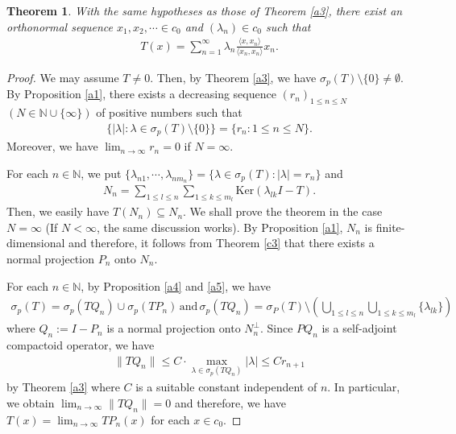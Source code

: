 \documentclass[12pt]{amsart}
\theoremstyle{plain}
\newtheorem{thm}[prop] {Theorem}
\theoremstyle{definition}
\begin{document}
\begin{thm} \label{a6}
  With the same hypotheses as those of Theorem \ref{a3}, there exist an orthonormal sequence $x_1, x_2, \cdots \in c_0$ and $(\lambda_n) \in c_0$ such that 
  \begin{align*}
    T(x) = \sum_{n=1}^\infty \lambda_n \frac{\langle x, x_n \rangle}{\langle x_n, x_n \rangle} x_n.
  \end{align*}
\end{thm}
\begin{proof}
  We may assume $T \neq 0$. Then, by Theorem \ref{a3}, we have $\sigma_p(T) \setminus \{0\} \neq \emptyset$. By Proposition \ref{a1}, there exists a decreasing sequence $(r_n)_{1 \le n \le N}$ $(N \in \mathbb{N} \cup \{\infty\})$ of positive numbers such that 
  \begin{align*}
    \{ |\lambda| : \lambda \in \sigma_p(T) \setminus \{0\}  \} = \{r_n : 1 \le n \le N\}.
  \end{align*}
Moreover, we have $\lim_{n \to \infty} r_n = 0$ if $N = \infty$. \par
 For each $n \in \mathbb{N}$, we put $\{ \lambda_{n 1}, \cdots , \lambda_{n m_n}\} = \{ \lambda \in \sigma_p(T) : |\lambda| = r_n\}$ and 
  \begin{align*}
     N_n = \sum_{1 \le l \le n} \sum_{1\le k \le m_l} \text{Ker} (\lambda_{lk} I - T).
  \end{align*}
  Then, we easily have $T(N_n) \subseteq N_n$. We shall prove the theorem in the case $N = \infty$ (If $N < \infty$, the same discussion works). By Proposition \ref{a1}, $N_n$ is finite-dimensional and therefore, it follows from Theorem \ref{c3} that there exists a normal projection $P_n$ onto $N_n$. \par
  For each $n \in \mathbb{N}$, by Proposition \ref{a4} and \ref{a5}, we have
  \begin{align*}
    \sigma_p(T) = \sigma_p(TQ_n) \cup \sigma_p(TP_n) \, \text{and} \,  \sigma_p(TQ_n) = \sigma_P(T) \setminus (\bigcup_{1 \le l \le n} \bigcup_{1\le k \le m_l} \{ \lambda _{lk} \})
  \end{align*}
  where $Q_n := I - P_n$ is a normal projection onto $N_n^{\perp}$. Since $PQ_n$ is a self-adjoint compactoid operator, we have 
  \begin{align*}
    \|TQ_n\| \le C \cdot \max_{\lambda \in \sigma_p(TQ_n)} |\lambda| \le C r_{n+1}
  \end{align*}
  by Theorem \ref{a3} where $C$ is a suitable constant independent of $n$. In particular, we obtain $\lim_{n \to \infty}\|TQ_n\| = 0$ and therefore, we have $T(x) = \lim_{n \to \infty}TP_n(x)$ for each $x \in c_0$. \par

\end{proof}
\end{document}
